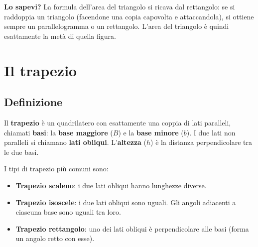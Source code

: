 \begin{sapevi}
    \textbf{Lo sapevi?} La formula dell'area del triangolo si ricava dal rettangolo: se si raddoppia un triangolo (facendone una copia capovolta e attaccandola), si ottiene sempre un parallelogramma o un rettangolo. L'area del triangolo è quindi esattamente la metà di quella figura.
\end{sapevi}

\section{Il trapezio}

\subsection{Definizione}

\begin{definizione}
    Il \textbf{trapezio} è un quadrilatero con esattamente una coppia di lati paralleli, chiamati \textbf{basi}: la \textbf{base maggiore} ($B$) e la \textbf{base minore} ($b$). I due lati non paralleli si chiamano \textbf{lati obliqui}. L'\textbf{altezza} ($h$) è la distanza perpendicolare tra le due basi.
\end{definizione}

I tipi di trapezio più comuni sono:
\begin{itemize}[leftmargin=1.5em]
    \item \textbf{Trapezio scaleno}: i due lati obliqui hanno lunghezze diverse.
    \item \textbf{Trapezio isoscele}: i due lati obliqui sono uguali. Gli angoli adiacenti a ciascuna base sono uguali tra loro.
    \item \textbf{Trapezio rettangolo}: uno dei lati obliqui è perpendicolare alle basi (forma un angolo retto con esse).
\end{itemize}

\begin{center}
\end{center}

